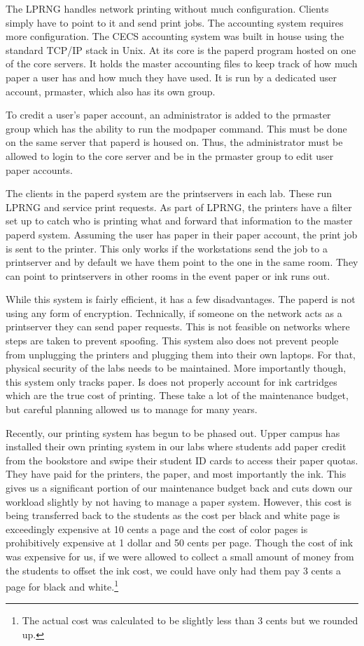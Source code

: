 The LPRNG handles network printing without much configuration.  Clients simply have to point to it and send print jobs.  The accounting system requires more configuration.  The CECS accounting system was built in house using the standard TCP/IP stack in Unix.  At its core is the paperd program hosted on one of the core servers.  It holds the master accounting files to keep track of how much paper a user has and how much they have used.  It is run by a dedicated user account, prmaster, which also has its own group.  

To credit a user's paper account, an administrator is added to the prmaster group which has the ability to run the modpaper command.  This must be done on the same server that paperd is housed on.  Thus, the administrator must be allowed to login to the core server and be in the prmaster group to edit user paper accounts.  

The clients in the paperd system are the printservers in each lab.  These run LPRNG and service print requests.  As part of LPRNG, the printers have a filter set up to catch who is printing what and forward that information to the master paperd system.  Assuming the user has paper in their paper account, the print job is sent to the printer. This only works if the workstations send the job to a printserver and by default we have them point to the one in the same room. They can point to printservers in other rooms in the event paper or ink runs out. 

While this system is fairly efficient, it has a few disadvantages.  The paperd is not using any form of encryption.  Technically, if someone on the network acts as a printserver they can send paper requests.  This is not feasible on networks where steps are taken to prevent spoofing.  This system also does not prevent people from unplugging the printers and plugging them into their own laptops.  For that, physical security of the labs needs to be maintained.  More importantly though, this system only tracks paper.  Is does not properly account for ink cartridges which are the true cost of printing.  These take a lot of the maintenance budget, but careful planning allowed us to manage for many years.  

Recently, our printing system has begun to be phased out.  Upper campus has installed their own printing system in our labs where students add paper credit from the bookstore and swipe their student ID cards to access their paper quotas.  They have paid for the printers, the paper, and most importantly the ink.  This gives us a significant portion of our maintenance budget back and cuts down our workload slightly by not having to manage a paper system.  However, this cost is being transferred back to the students as the cost per black and white page is exceedingly expensive at 10 cents a page and the cost of color pages is prohibitively expensive at 1 dollar and 50 cents per page.  Though the cost of ink was expensive for us, if we were allowed to collect a small amount of money from the students to offset the ink cost, we could have only had them pay 3 cents a page for black and white.\footnote{The actual cost was calculated to be slightly less than 3 cents but we rounded up.}  

